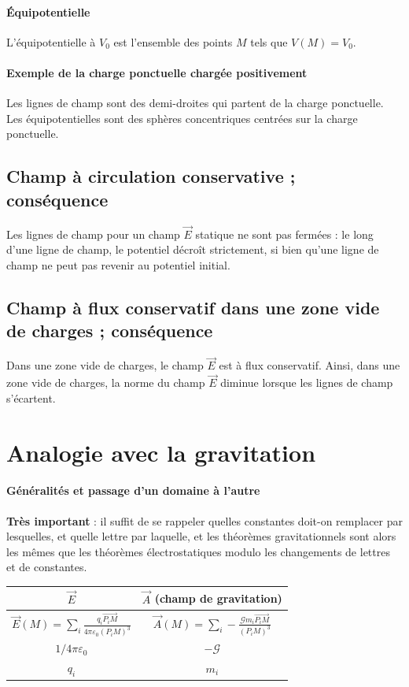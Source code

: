 \documentclass[french]{book}
\theoremstyle{plain}
\theoremstyle{definition}
\theoremstyle{remark}
\begin{document}
\paragraph{Équipotentielle}L'équipotentielle à $V_0$ est l'ensemble des points $M$ tels que $V(M)=V_0$.
\paragraph{Exemple de la charge ponctuelle chargée positivement} Les lignes de champ sont des demi-droites qui partent de la charge ponctuelle. Les équipotentielles sont des sphères concentriques centrées sur la charge ponctuelle.
\subsection{Champ à circulation conservative ; conséquence}
Les lignes de champ pour un champ $\overrightarrow{E}$ statique ne sont pas fermées : le long d'une ligne de champ, le potentiel décroît strictement, si bien qu'une ligne de champ ne peut pas revenir au potentiel initial.
\subsection{Champ à flux conservatif dans une zone vide de charges ; conséquence}
Dans une zone vide de charges, le champ $\overrightarrow{E}$ est à flux conservatif. Ainsi, dans une zone vide de charges, la norme du champ $\overrightarrow{E}$ diminue lorsque les lignes de champ s'écartent.
\section{Analogie avec la gravitation}
\paragraph{Généralités et passage d'un domaine à l'autre} \textbf{Très important} : il suffit de se rappeler quelles constantes doit-on remplacer par lesquelles, et quelle lettre par laquelle, et les théorèmes gravitationnels sont alors les mêmes que les théorèmes électrostatiques modulo les changements de lettres et de constantes.
\begin{center}
	\begin{tabular}{|c|c|}
		\hline
		$\overrightarrow{E}$&$\overrightarrow{A}$ (champ de gravitation)\\[4mm]
		\hline
		$\displaystyle\overrightarrow{E}(M)=\sum_i\frac{q_i\overrightarrow{P_iM}}{4\pi\varepsilon_0(P_iM)^3}$&$\displaystyle\overrightarrow{A}(M)=\sum_i-\frac{\mathcal{G}m_i\overrightarrow{P_iM}}{(P_iM)^3}$ \\[4mm]
		\hline
		$1/4\pi\varepsilon_0$&$-\mathcal{G}$ \\[4mm]
		\hline
		$q_i$&$m_i$ \\[4mm]
		\hline
	\end{tabular}
\end{center}
\end{document}
